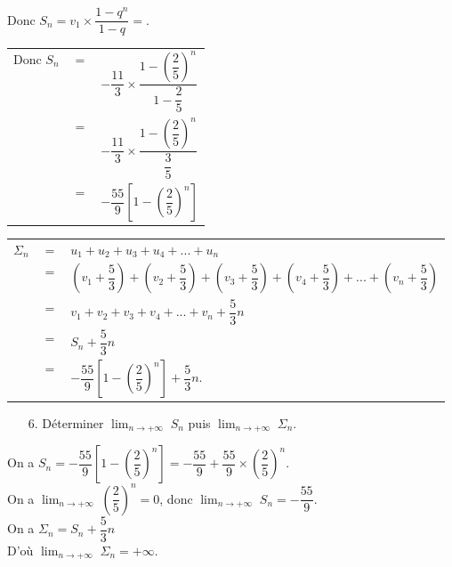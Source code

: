 Donc $S_n = v_1 \times \dfrac{1 - q^{n}}{1 - q} =$. \\

\begin{tabular}{lll}
Donc $S_n$ & $=$ & $-\dfrac{11}{3} \times \dfrac{1 - \left(\dfrac{2}{5}\right)^n}{1 - \dfrac{2}{5}}$ \vspace*{.3cm} \\
& $=$ & $-\dfrac{11}{3} \times \dfrac{1 - \left(\dfrac{2}{5}\right)^n}{\dfrac{3}{5}}$ \vspace*{.3cm} \\
& $=$ & $-\dfrac{55}{9} \left[1 - \left(\dfrac{2}{5}\right)^n\right]$ \\
\end{tabular} 

\vspace*{.3cm}

\begin{tabular}{lll}
$\Sigma_n$ & $=$ & $u_1 + u_2 + u_3 + u_4 + ... + u_n$ \vspace*{.2cm} \\
& $=$ & $\left(v_1 + \dfrac{5}{3}\right) + \left(v_2 + \dfrac{5}{3}\right) + \left(v_3 + \dfrac{5}{3}\right) + \left(v_4 + \dfrac{5}{3}\right) + ... + \left(v_n + \dfrac{5}{3}\right)$ \vspace*{.2cm} \\
& $=$ & $v_1 + v_2 + v_3 + v_4 + ... + v_n + \dfrac{5}{3}n$ \vspace*{.2cm} \\
& $=$ & $S_n + \dfrac{5}{3}n$ \vspace*{.2cm} \\
& $=$ & $-\dfrac{55}{9}\left[1 - \left(\dfrac{2}{5}\right)^n\right] + \dfrac{5}{3}n$. \\
\end{tabular}

\vspace*{.3cm}

\begin{itemize}
\item[6.] Déterminer $ \displaystyle {\lim_{n \rightarrow +\infty}} \; S_n$ puis $ \displaystyle {\lim_{n \rightarrow +\infty}} \; \Sigma_n$. \\
\end{itemize}

On a $S_n = -\dfrac{55}{9} \left[1 - \left(\dfrac{2}{5}\right)^n\right] = -\dfrac{55}{9} + \dfrac{55}{9} \times \left(\dfrac{2}{5}\right)^n$. \\

On a $ \displaystyle {\lim_{n \rightarrow +\infty}} \; \left(\dfrac{2}{5}\right)^n = 0$, donc $ \displaystyle {\lim_{n \rightarrow +\infty}} \; S_n = -\dfrac{55}{9}$. \vspace*{.3cm} \\

On a $\Sigma_n = S_n + \dfrac{5}{3}n$ \\

D'où $ \displaystyle {\lim_{n \rightarrow +\infty}} \; \Sigma_n = +\infty$.

\vspace*{-5cm}

\newpage